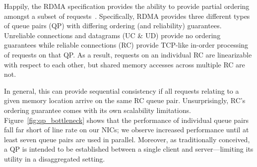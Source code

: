 Happily, the RDMA specification provides the ability to provide
partial ordering amongst a subset of requests~\cite{infiniband-spec}.
Specifically, RDMA provides three different types of queue pairs (QP)
with differing ordering (and reliability) guarantees. Unreliable
connections and datagrams (UC \& UD) provide no ordering guarantees
while reliable connections (RC) provide TCP-like in-order processing
of requests on that QP.  As a result, requests on an individual RC are
linearizable with respect to each other, but shared memory accesses
across multiple RC are not.
%
%

In general, this can provide sequential consistency if all requests
relating to a given memory location arrive on the same RC queue pair.
Unsurprisingly, RC's ordering guarantee comes with its own
scalability limitations.  Figure~\ref{fig:qp_bottleneck} shows that
the performance of individual queue pairs fall far short of line
rate on our NICs; we observe increased performance until at least
seven queue pairs are used in parallel.  Moreover, as traditionally
conceived, a QP is intended to be established between a single
client and server---limiting its utility in a disaggregated setting.





